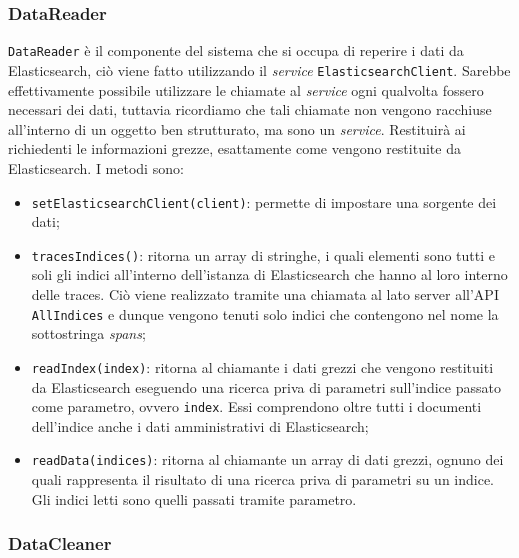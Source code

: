 \subsubsection{DataReader}
\label{sec:DataReader}
\texttt{DataReader} è il componente del sistema che si occupa di reperire i dati da Elasticsearch, ciò viene fatto utilizzando il \emph{service} \texttt{ElasticsearchClient}. Sarebbe effettivamente possibile utilizzare le chiamate al \emph{service} ogni qualvolta fossero necessari dei dati, tuttavia ricordiamo che tali chiamate non vengono racchiuse all'interno di un oggetto ben strutturato, ma sono un \emph{service}. Restituirà ai richiedenti le informazioni grezze, esattamente come vengono restituite da Elasticsearch. I metodi sono: 
 

\begin{itemize}
	\item \texttt{setElasticsearchClient(client)}: permette di impostare una sorgente dei dati;
	\item \texttt{tracesIndices()}: ritorna un array di stringhe, i quali elementi sono tutti e soli gli indici all'interno dell'istanza di Elasticsearch che hanno al loro interno delle traces. Ciò viene realizzato tramite una chiamata al lato server all'API \texttt{AllIndices} e dunque vengono tenuti solo indici che contengono nel nome la sottostringa \emph{spans};
	\item \texttt{readIndex(index)}: ritorna al chiamante i dati grezzi che vengono restituiti da Elasticsearch eseguendo una ricerca priva di parametri sull'indice passato come parametro, ovvero \texttt{index}. Essi comprendono oltre tutti i documenti dell'indice anche i dati amministrativi di Elasticsearch;
	\item \texttt{readData(indices)}: ritorna al chiamante un array di dati grezzi, ognuno dei quali rappresenta il risultato di una ricerca priva di parametri su un indice. Gli indici letti sono quelli passati tramite parametro.


\end{itemize}



\subsubsection{DataCleaner}

